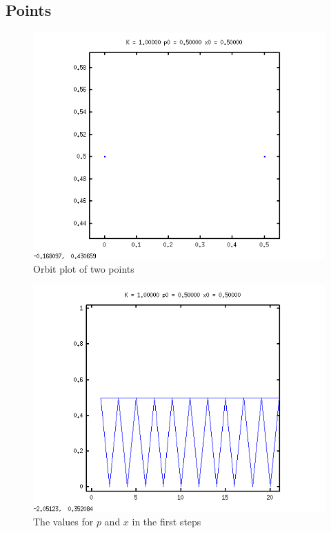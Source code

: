 \documentclass{article}
\begin{document}
\subsection*{Points}
\begin{figure}[h!]
\centering
\includegraphics[width=\textwidth]{pointorbit.png}
\caption{Orbit plot of two points}
\label{pointorbit}
\end{figure}
\begin{figure}[h!]
\centering
\includegraphics[width=\textwidth]{pointsvalues.png}
\caption{The values for $p$ and $x$ in the first steps }
\label{pointval}
\end{figure}
\end{document}
